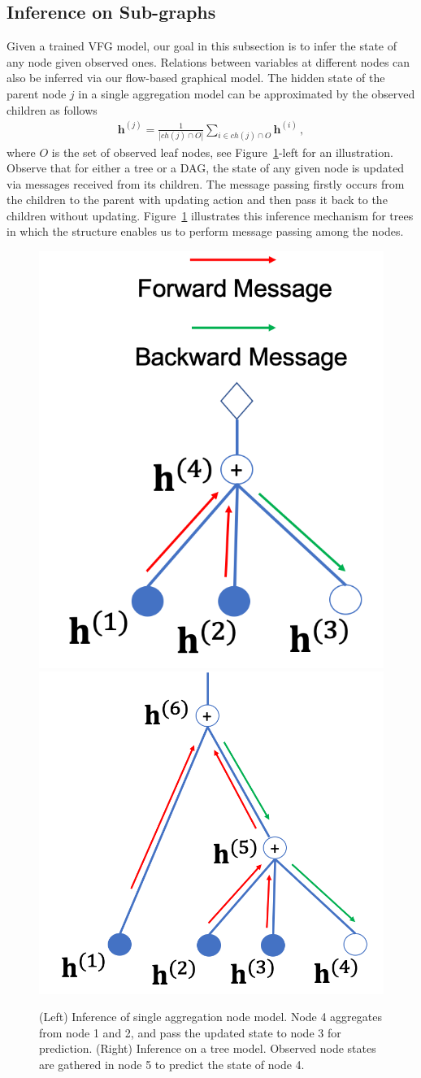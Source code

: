 \documentclass[twoside]{article}
\begin{document}
\subsection{Inference on Sub-graphs }\label{sec:infer}
Given a trained VFG model, our goal in this subsection is to infer the state of any node given observed ones. 
Relations between variables at different nodes can also be inferred via our flow-based graphical model. 
The hidden state of the parent node $j$ in a single aggregation model can be approximated by the observed children as follows
\begin{align}\label{eq:aggr_obs_ch}
\mathbf{h}^{(j)}  = \frac{1}{|ch(j) \cap O|}\sum_{i \in ch(j) \cap O} \mathbf{h}^{(i)} \, ,
\end{align}
where $O$ is the set of observed leaf nodes, see Figure~\ref{fig:two_layer_infer}-left for an illustration. 
Observe that for either a tree or a DAG, the state of any given node is updated via messages received from its children. 
The message passing firstly occurs from the children to the parent with updating action and then pass it back to the children without updating. 
Figure~\ref{fig:two_layer_infer} illustrates this inference mechanism for trees in which  the structure enables us to perform message passing among the nodes. 
\begin{figure}[H]
\begin{center}
 \includegraphics[width=0.4\linewidth]{fig/two_layer_infer.png}
 \hspace{0.15in}
 \includegraphics[width=0.5\linewidth]{fig/dag_infer.png}
\end{center}
\vspace{-0.1in}
 \caption{{\small (Left) Inference of single aggregation node model. Node 4 aggregates from node 1 and 2, and  pass the updated state to node 3 for prediction. (Right) Inference on a tree model. Observed node states are gathered in node 5 to predict the state of node 4.}}
\label{fig:two_layer_infer}
\end{figure}
\end{document}
